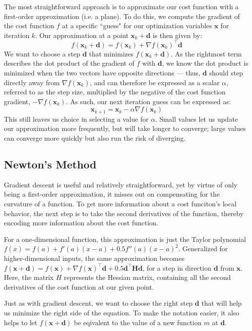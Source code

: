 \documentclass[12pt]{article}
\begin{document}
The most straightforward approach is to approximate our cost function with a first-order approximation (i.e. a plane).
To do this, we compute the gradient of the cost function \(f\) at a specific ``guess" for our optimization variables
\(\mathbf{x}\) for iteration \(k\). Our approximation at a point \(\mathbf{x}_k + \mathbf{d}\) is then given by:
\[f(\mathbf{x}_k + \mathbf{d}) = f(\mathbf{x}_k) + \nabla f(\mathbf{x}_k)^\top \mathbf{d}\]
We want to choose a step \(\mathbf{d}\) that minimizes \(f(\mathbf{x}_k + \mathbf{d})\). As the rightmost term describes
the dot product of the gradient of \(f\) with \(\mathbf{d}\), we know the dot product is minimized when the two
vectors have opposite directions --- thus, \(\mathbf{d}\) should step directly away from 
\(\nabla f(\mathbf{x}_k)\), and can therefore be expressed as a scalar \(\alpha\), referred to as the step size,
multiplied by the negative of the cost function gradient, \(-\nabla f(\mathbf{x}_k)\). As such, our next iteration guess 
can be expressed as:
\[\mathbf{x}_{k+1} = \mathbf{x}_k - \alpha \nabla f(\mathbf{x}_k)\]
This still leaves us choice in selecting a value for \(\alpha\). Small values let us update our approximation more frequently,
but will take longer to converge; large values can converge more quickly but also run the risk of diverging.

\subsection{Newton's Method}
Gradient descent is useful and relatively straightforward, yet by virtue of only being a first-order approximation,
it misses out on compensating for the curvature of a function. To get more information about a cost funciton's local
behavior, the next step is to take the second derivatives of the function, thereby encoding more information about the
cost function. 

For a one-dimensional function, this approximation is just the Taylor polynomial 
\(f(x) = f(a) + f'(a)(x-a) + 0.5 f''(a)(x-a)^2\). Generalized for higher-dimensional inputs, the same approximation
becomes \(f(\mathbf{x}+\mathbf{d}) = f(\mathbf{x}) + \nabla f(\mathbf{x})^\top \mathbf{d} + 0.5\mathbf{d}^\top \mathbf{H} \mathbf{d}\),
for a step in direction \(\mathbf{d}\) from \(\mathbf{x}\). Here, the matrix \(H\) represents the Hessian matrix,
containing all the second derivatives of the cost function at our given point. 

Just as with gradient descent, we want to choose the right step \(\mathbf{d}\) that will help us
minimize the right side of the equation. To make the notation easier, it also helps to let \(f(\mathbf{x}+\mathbf{d})\)
be eqivalent to the value of a new function \(m\) at \(\mathbf{d}\).
\end{document}
